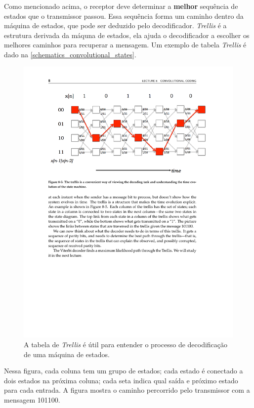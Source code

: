 	Como mencionado acima, o receptor deve determinar a \textbf{melhor} sequência de estados que o transmissor passou. Essa sequência forma um caminho dentro da máquina de estados, que pode ser deduzido pelo decodificador. \textit{Trellis} é a estrutura derivada da máquna de estados, ela ajuda o decodificador a escolher os melhores caminhos para recuperar a mensagem. Um exemplo de tabela \textit{Trellis} é dado na \autoref{schematics_convolutional_states}.
	\begin{figure}[htb]
		\caption{\label{schematics_convolutional_trellis} A tabela de \textit{Trellis} é útil para entender o processo de decodificação de uma máquina de estados.}
		\centering
		\includegraphics[width=0.6\textheight,trim={0cm 18cm 0cm 2.5cm},clip]{schematics/convolutional_trellis.pdf}
	\end{figure}
	Nessa figura, cada coluna tem um grupo de estados; cada estado é conectado a dois estados na próxima coluna; cada seta indica qual saída e próximo estado para cada entrada. A figura mostra o caminho percorrido pelo transmissor com a mensagem 101100. 
	
